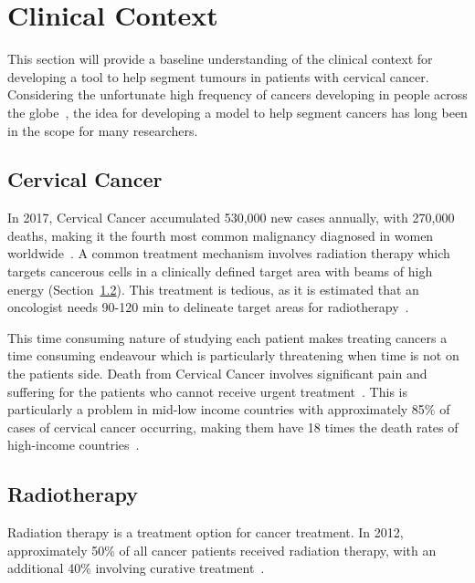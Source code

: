 \documentclass[11pt,twoside]{report}
\begin{document}
\section{Clinical Context}\label{sect:clinical-context}

This section will provide a baseline understanding of the clinical context for developing a tool to help segment tumours in patients with cervical cancer. Considering the unfortunate high frequency of cancers developing in people across the globe~\cite{cervical-cancer-epidemic}, the idea for developing a model to help segment cancers has long been in the scope for many researchers.

\subsection{Cervical Cancer}\label{sect:cervical-cancer}

In 2017, Cervical Cancer accumulated 530,000 new cases annually, with 270,000 deaths, making it the fourth most common malignancy diagnosed in women worldwide~\cite{cervical-cancer-epidemic}. A common treatment mechanism involves radiation therapy which targets cancerous cells in a clinically defined target area with beams of high energy (Section~\ref{sect:radiotherapy}). This treatment is tedious, as it is estimated that an oncologist needs 90-120 min to delineate target areas for radiotherapy~\cite{LIU2020184}.

This time consuming nature of studying each patient makes treating cancers a time consuming endeavour which is particularly threatening when time is not on the patients side. Death from Cervical Cancer involves significant pain and suffering for the patients who cannot receive urgent treatment~\cite{cervical-cancer-epidemic}. This is particularly a problem in mid-low income countries with approximately 85\% of cases of cervical cancer occurring, making them have 18 times the death rates of high-income countries~\cite{cervical-cancer-epidemic}. 

\subsection{Radiotherapy}\label{sect:radiotherapy}

Radiation therapy is a treatment option for cancer treatment. In 2012, approximately 50\% of all cancer patients received radiation therapy, with an additional 40\% involving curative treatment~\cite{radiotherapy-advances}. 
\end{document}
